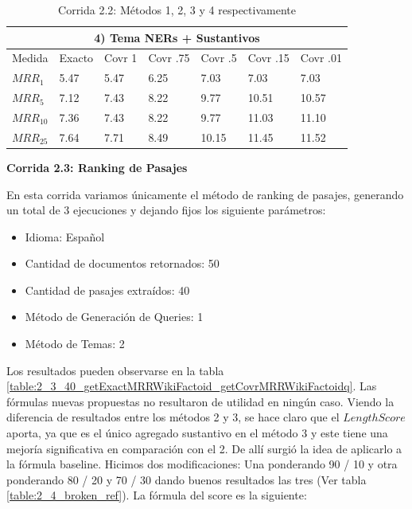 \begin{table}
\begin{center}
\medskip

\begin{tabular}{|l | l | l | l | l | l | l |}
\hline
\multicolumn{7}{|c|}{4) Tema NERs + Sustantivos}  \\ \hline
Medida & Exacto & Covr 1 & Covr .75 & Covr .5 & Covr .15 & Covr .01 \\ \hline
$MRR_{1}$ & 5.47 & 5.47 & 6.25 & 7.03 & 7.03 & 7.03  \\ \hline
$MRR_{5}$ & 7.12 & 7.43 & 8.22 & 9.77 & 10.51 & 10.57  \\ \hline
$MRR_{10}$ & 7.36 & 7.43 & 8.22 & 9.77 & 11.03 & 11.10  \\ \hline
$MRR_{25}$ & 7.64 & 7.71 & 8.49 & 10.15 & 11.45 & 11.52  \\ \hline
\end{tabular}


\caption{Corrida 2.2: Métodos 1, 2, 3 y 4 respectivamente}
\label{table:2_2_40_getExactMRRWikiFactoid_getCovrMRRWikiFactoidy}
\end{center}
\end{table}


\textbf{Corrida 2.3: Ranking de Pasajes}\newline

En esta corrida variamos únicamente el método de ranking de pasajes, generando un total de 3 ejecuciones y dejando fijos los siguiente parámetros:


\begin{itemize}
  \item Idioma: Español
  \item Cantidad de documentos retornados: 50
  \item Cantidad de pasajes extraídos: 40
  \item Método de Generación de Queries: 1
  \item Método de Temas: 2
\end{itemize}

Los resultados pueden observarse en la tabla \ref{table:2_3_40_getExactMRRWikiFactoid_getCovrMRRWikiFactoidq}. Las fórmulas nuevas propuestas no resultaron de utilidad en ningún caso. Viendo la diferencia de resultados entre los métodos 2 y 3, se hace claro que el $LengthScore$ aporta, ya que es el único agregado sustantivo en el método 3 y este tiene una mejoría significativa en comparación con el 2. De allí surgió la idea de aplicarlo a la fórmula baseline.
Hicimos dos modificaciones: Una ponderando 90 / 10 y otra ponderando 80 / 20 y 70 / 30 dando buenos resultados las tres (Ver tabla \ref{table:2_4_broken_ref}).
La fórmula del score es la siguiente:

